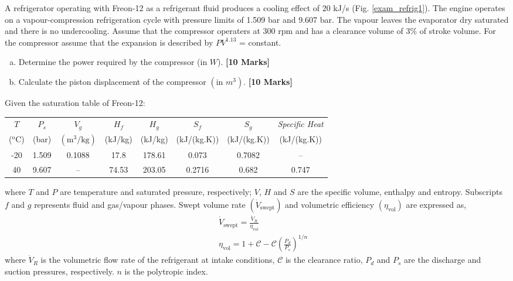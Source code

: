 \documentclass[calculator,steamtables]{exam}
\newcommand{\frc}{\displaystyle\frac}
\begin{document}
\clearpage


\begin{question}A refrigerator operating with Freon-12 as a refrigerant fluid produces a cooling effect of 20 kJ/s (Fig. \ref{exam_refrig1}). The engine operates on a vapour-compression refrigeration cycle with pressure limits of 1.509 bar and 9.607 bar. The vapour leaves the evaporator dry saturated and there is no undercooling.  Assume that the compressor operaters at 300 rpm and has a clearance volume of 3$\%$ of stroke volume.  For the compressor assume that the expansion is described by $PV^{1.13}$ = constant. 
\begin{enumerate}[(a)]
\item Determine the power required by the compressor (in $W$). {\bf [10 Marks]}
\item Calculate the piston displacement of the compressor $\left(\text{in } m^{3}\right)$. {\bf [10 Marks]}
\end{enumerate}

\medskip
Given the saturation table of Freon-12:
\begin{center}
\begin{tabular}{|c c| c c c c c c| }
\hline
$T$             & $P_{s}$  & $V_{g}$  & $H_{f}$  & $H_{g}$   &  $S_{f}$   &  $S_{g}$   & {\it Specific Heat} \\
($^{\text{o}}$C)  & (bar)   & $\left(\text{m}^{3}/\text{kg}\right)$ & (kJ/kg) & (kJ/kg) & (kJ/(kg.K)) &  (kJ/(kg.K)) &   (kJ/(kg.K)) \\
\hline
-20   & 1.509 & 0.1088 & 17.8 & 178.61 & 0.073 & 0.7082 & -- \\
40    & 9.607 & --     & 74.53 & 203.05 & 0.2716 & 0.682 & 0.747 \\
\hline
\end{tabular}
\end{center}
where $T$ and $P$ are temperature and saturated pressure, respectively; $V$, $H$ and $S$ are the specific volume, enthalpy and entropy. Subscripts $f$ and $g$ represents fluid and gas/vapour phases. Swept volume rate $\left(\dot{V}_{\text{swept}}\right)$ and volumetric efficiency $\left(\eta_{\text{vol}}\right)$ are expressed as,
\begin{eqnarray}
&& \dot{V}_{\text{swept}} = \frc{\dot{V}_{R}}{\eta_{\text{vol}}} \nonumber \\
&& \eta_{\text{vol}} = 1 + \mathcal{C} - \mathcal{C}\left(\frc{P_{d}}{P_{s}}\right)^{1/n} \nonumber  
\end{eqnarray}
where $\dot{V}_{R}$ is the volumetric flow rate of the refrigerant at intake conditions, $\mathcal{C}$ is the clearance ratio, $P_{d}$ and $P_{s}$ are the discharge and suction pressures, respectively. $n$ is the polytropic index.



\end{question}
\end{document}
